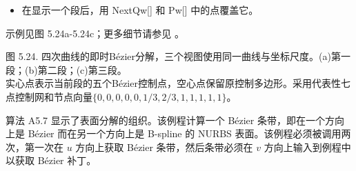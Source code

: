 \documentclass[../main.tex]{subfiles}
\begin{document}
\begin{itemize}
\item 在显示一个段后，用 NextQw[] 和 Pw[] 中的点覆盖它。
\end{itemize}

示例见图 5.24a-5.24c；更多细节请参见 \cite{Pieg91b}。

\begin{center}
\begin{minipage}{38cm}
\vspace*{.6\baselineskip}
\centering
\begin{minipage}[b]{12.2cm}
\end{minipage}\hfill
\begin{minipage}[b]{25.2cm}
\end{minipage}
\par\smallskip
图 5.24. 四次曲线的即时Bézier分解，三个视图使用同一曲线与坐标尺度。(a)第一段；(b)第二段；(c)第三段。\\
实心点表示当前段的五个Bézier控制点，空心点保留原控制多边形。采用代表性七点控制网和节点向量$\{0,0,0,0,0,1/3,2/3,1,1,1,1,1\}$。
\end{minipage}
\end{center}

算法 A5.7 显示了表面分解的组织。该例程计算一个 Bézier 条带，即在一个方向上是 Bézier 而在另一个方向上是 B-spline 的 NURBS 表面。该例程必须被调用两次，第一次在 \(u\) 方向上获取 Bézier 条带，然后条带必须在 \(v\) 方向上输入到例程中以获取 Bézier 补丁。
\end{document}

